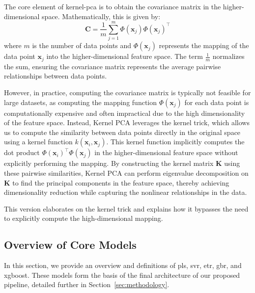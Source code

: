 The core element of \gls{kernel-pca} is to obtain the covariance matrix in the higher-dimensional space. 
Mathematically, this is given by:
$$
	\mathbf{C} = \frac{1}{m} \sum_{j=1}^{m} \Phi(\mathbf{x}_j) \Phi(\mathbf{x}_j)^\top
$$
where $m$ is the number of data points and $\Phi(\mathbf{x}_j)$ represents the mapping of the data point $\mathbf{x}_j$ into the higher-dimensional feature space. 
The term $\frac{1}{m}$ normalizes the sum, ensuring the covariance matrix represents the average pairwise relationships between data points.

However, in practice, computing the covariance matrix is typically not feasible for large datasets, as computing the mapping function \(\Phi(\mathbf{x}_j)\) for each data point is computationally expensive and often impractical due to the high dimensionality of the feature space. 
Instead, Kernel PCA leverages the kernel trick, which allows us to compute the similarity between data points directly in the original space using a kernel function \(k(\mathbf{x}_i, \mathbf{x}_j)\). 
This kernel function implicitly computes the dot product \(\Phi(\mathbf{x}_i)^\top \Phi(\mathbf{x}_j)\) in the higher-dimensional feature space without explicitly performing the mapping. 
By constructing the kernel matrix \(\mathbf{K}\) using these pairwise similarities, Kernel PCA can perform eigenvalue decomposition on \(\mathbf{K}\) to find the principal components in the feature space, thereby achieving dimensionality reduction while capturing the nonlinear relationships in the data.

This version elaborates on the kernel trick and explains how it bypasses the need to explicitly compute the high-dimensional mapping.




\subsection{Overview of Core Models}
In this section, we provide an overview and definitions of \gls{pls}, \gls{svr}, \gls{etr}, \gls{gbr}, and \gls{xgboost}.
These models form the basis of the final architecture of our proposed pipeline, detailed further in Section~\ref{sec:methodology}.

